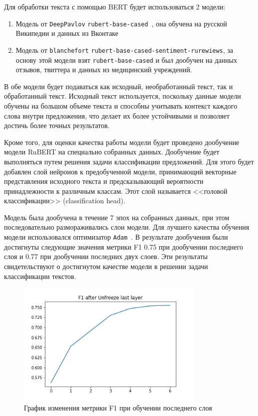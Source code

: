 \documentclass[PI, VKR]{HSEUniversity}
\begin{document}
Для обработки текста с помощью BERT будет использоваться 2 модели:
\begin{enumerate}
\item Модель от \texttt{DeepPavlov} \texttt{rubert-base-cased}~\autocite{kuratov_adaptation_2019}, она обучена на русской Википедии и данных из Вконтаке
\item Модель от \texttt{blanchefort} \texttt{rubert-base-cased-sentiment-rurewiews}, за основу этой модели взят \texttt{rubert-base-cased} и был дообучен на данных отзывов, твиттера и данных из медицинский учреждений.
\end{enumerate}

В обе модели будет подаваться как исходный, необработанный текст, так и обработанный текст. Исходный текст используется, поскольку данные модели обучены на большом объеме текста и способны учитывать контекст каждого слова внутри предложения, что делает их более устойчивыми и позволяет достичь более точных результатов.

Кроме того, для оценки качества работы модели будет проведено дообучение модели RuBERT на специально собранных данных. Дообучение будет выполняться путем решения задачи классификации предложений. Для этого будет добавлен слой нейронов к предобученной модели, принимающий векторные представления исходного текста и предсказывающий вероятности принадлежности к различным классам. Этот слой называется {}<<головой классификации>>{} (classification head).

Модель была дообучена в течение 7 эпох на собранных данных, при этом последовательно размораживались слои модели. Для лучшего качества обучения модели использовался оптимизатор \texttt{Adam}~\autocite{kingma_adam_2017}. В результате дообучения были достигнуты следующие значения метрики F1 0.75 при дообучении последнего слоя и 0.77 при дообучении последних двух слоев. Эти результаты свидетельствуют о достигнутом качестве модели в решении задачи классификации текстов.

\begin{figure}[h]
\centering
\includegraphics[width=0.8\textwidth]{img/DeepPavlovrubert-base-cased F1 Unfreeze last layer.png}
\caption{\label{fig:bert_unfreeze_last}График изменения метрики F1 при обучении последнего слоя}
\end{figure}
\end{document}
